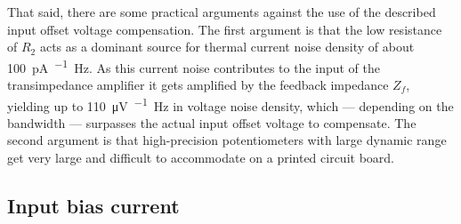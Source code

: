 That said, there are some practical arguments against the use of the described input offset voltage compensation.
The first argument is that the low resistance of $R_2$ acts as a dominant source for thermal current noise density of about \SI{100}{\pico\ampere\per\sqrt\hertz}.
As this current noise contributes to the input of the transimpedance amplifier it gets amplified by the feedback impedance $Z_f$, yielding up to \SI{110}{\micro\volt\per\sqrt\hertz} in voltage noise density, which --- depending on the bandwidth --- surpasses the actual input offset voltage to compensate.
The second argument is that high-precision potentiometers with large dynamic range get very large and difficult to accommodate on a printed circuit board.

\subsection{Input bias current}

